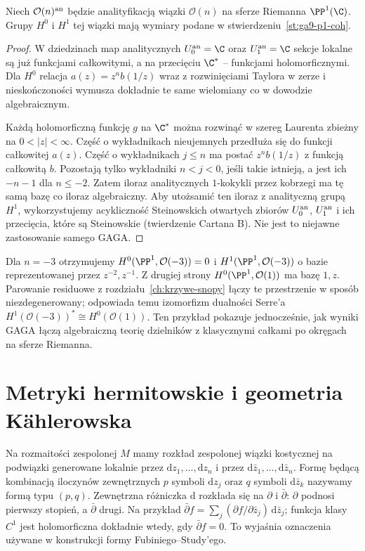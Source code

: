 \begin{stwierdzenie}
\label{st:ga9-p1-analytic}
Niech $\mathcal O(n)^{\rm an}$ będzie analityfikacją
wiązki $\mathcal O(n)$ na sferze Riemanna
$\PP^1(\C)$. Grupy $H^0$ i $H^1$ tej wiązki
mają wymiary podane w
stwierdzeniu~\ref{st:ga9-p1-coh}.
\end{stwierdzenie}
\begin{proof}
W dziedzinach map analitycznych $U_0^{\rm an}=\C$ oraz
$U_1^{\rm an}=\C$ sekcje lokalne są już funkcjami
całkowitymi, a na przecięciu $\C^*$ -- funkcjami
holomorficznymi. Dla $H^0$ relacja
$a(z)=z^n b(1/z)$ wraz z rozwinięciami Taylora
w zerze i nieskończoności wymusza dokładnie
te same wielomiany co w dowodzie algebraicznym.

Każdą holomorficzną funkcję $g$ na $\C^*$ można
rozwinąć w szereg Laurenta zbieżny na
$0<|z|<\infty$. Część o wykładnikach nieujemnych
przedłuża się do funkcji całkowitej $a(z)$.
Część o wykładnikach $j\le n$ ma postać
$z^n b(1/z)$ z funkcją całkowitą $b$.
Pozostają tylko wykładniki $n<j<0$, jeśli takie
istnieją, a jest ich $-n-1$ dla $n\le-2$.
Zatem iloraz analitycznych $1$-kokykli przez
kobrzegi ma tę samą bazę co iloraz algebraiczny.
Aby utożsamić ten iloraz z analityczną grupą
$H^1$, wykorzystujemy acykliczność Steinowskich
otwartych zbiorów $U_0^{\rm an}$, $U_1^{\rm an}$
i ich przecięcia, które są Steinowskie (twierdzenie Cartana B).
Nie jest to niejawne zastosowanie samego GAGA.
\end{proof}

\begin{przyklad}
Dla $n=-3$ otrzymujemy $H^0(\PP^1,\mathcal O(-3))=0$
i $H^1(\PP^1,\mathcal O(-3))$ o bazie reprezentowanej
przez $z^{-2},z^{-1}$. Z drugiej strony
$H^0(\PP^1,\mathcal O(1))$ ma bazę $1,z$.
Parowanie residuowe z rozdziału~\ref{ch:krzywe-snopy}
łączy te przestrzenie w sposób niezdegenerowany;
odpowiada temu izomorfizm dualności Serre'a
$H^1(\mathcal O(-3))^*\cong H^0(\mathcal O(1))$.
Ten przykład pokazuje jednocześnie, jak wyniki GAGA
łączą algebraiczną teorię dzielników z klasycznymi
całkami po okręgach na sferze Riemanna.
\end{przyklad}

\section{Metryki hermitowskie i geometria Kählerowska}
\label{sec:ga9-kahler}

Na rozmaitości zespolonej $M$ mamy rozkład zespolonej
wiązki kostycznej na podwiązki generowane lokalnie przez
$\mathrm dz_1,\ldots,\mathrm dz_n$ i przez
$\mathrm d\bar z_1,\ldots,\mathrm d\bar z_n$.
Formę będącą kombinacją iloczynów zewnętrznych $p$ symboli
$\mathrm dz_j$ oraz $q$ symboli $\mathrm d\bar z_k$
nazywamy formą typu $(p,q)$. Zewnętrzna różniczka
$\mathrm d$ rozkłada się na $\partial$ i $\bar\partial$:
$\partial$ podnosi pierwszy stopień, a $\bar\partial$ drugi.
Na przykład $\bar\partial f=\sum_j
(\partial f/\partial\bar z_j)\,\mathrm d\bar z_j$;
funkcja klasy $C^1$ jest holomorficzna dokładnie wtedy,
gdy $\bar\partial f=0$. To wyjaśnia oznaczenia używane
w konstrukcji formy Fubiniego--Study'ego.


